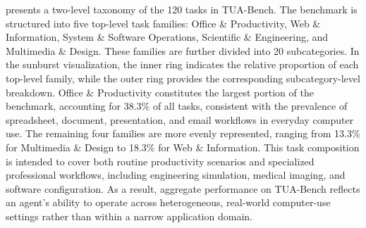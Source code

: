  presents a two-level taxonomy of the 120 tasks in TUA-Bench. The benchmark is structured into five top-level task families: Office \& Productivity, Web \& Information, System \& Software Operations, Scientific \& Engineering, and Multimedia \& Design. These families are further divided into 20 subcategories. In the sunburst visualization, the inner ring indicates the relative proportion of each top-level family, while the outer ring provides the corresponding subcategory-level breakdown. Office \& Productivity constitutes the largest portion of the benchmark, accounting for 38.3\% of all tasks, consistent with the prevalence of spreadsheet, document, presentation, and email workflows in everyday computer use. The remaining four families are more evenly represented, ranging from 13.3\% for Multimedia \& Design to 18.3\% for Web \& Information. This task composition is intended to cover both routine productivity scenarios and specialized professional workflows, including engineering simulation, medical imaging, and software configuration. As a result, aggregate performance on TUA-Bench reflects an agent's ability to operate across heterogeneous, real-world computer-use settings rather than within a narrow application domain.

